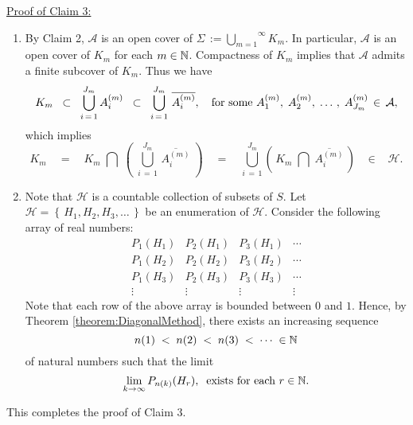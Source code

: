 \vskip 0.5cm
\noindent
\underline{Proof of Claim 3:}
\begin{enumerate}
\item
By Claim 2, $\mathcal{A}$ is an open cover of
$\Sigma \, := \overset{\infty}{\underset{m=1}{\bigcup}}K_{m}$.
In particular, $\mathcal{A}$ is an open cover of $K_{m}$ for each $m \in \mathbb{N}$.
Compactness of $K_{m}$ implies that $\mathcal{A}$ admits a finite subcover of $K_{m}$.
Thus we have
\begin{equation*}
K_{m}
\;\; \subset \;\; \bigcup^{J_{m}}_{i\,=\,1}A^{(m)}_{i}
\;\; \subset \;\; \bigcup^{J_{m}}_{i\,=\,1}\,\overline{A^{(m)}_{i}},
\quad
\textnormal{for some $A^{(m)}_{1},\;A^{(m)}_{2},\;\ldots\,,\;A^{(m)}_{J_{m}}\,\in\,\mathcal{A}$},
\end{equation*}
which implies
\begin{equation*}
K_{m}
\quad = \quad K_{m} \;\bigcap\; \left(\;\bigcup^{J_{m}}_{i\,=\,1}\,\overline{A^{(m)}_{i}} \;\right)
\quad = \quad \bigcup^{J_{m}}_{i\,=\,1} \left(\, K_{m} \;\bigcap\; \overline{A^{(m)}_{i}} \,\right)
\;\;\; \in \;\;\; \mathcal{H}.
\end{equation*}
\item
Note that $\mathcal{H}$ is a countable collection of subsets of $S$.
Let $\mathcal{H} = \left\{\,H_{1}, H_{2}, H_{3}, \ldots \,\right\}$ be an enumeration of $\mathcal{H}$.
Consider the following array of real numbers:
\begin{equation*}
\begin{array}{cccc}
P_{1}(H_{1}) & P_{2}(H_{1}) & P_{3}(H_{1}) & \cdots \\
P_{1}(H_{2}) & P_{2}(H_{2}) & P_{3}(H_{2}) & \cdots \\
P_{1}(H_{3}) & P_{2}(H_{3}) & P_{3}(H_{3}) & \cdots \\
\vdots & \vdots & \vdots & \vdots  
\end{array}
\end{equation*}
Note that each row of the above array is bounded between $0$ and $1$.
Hence, by Theorem \ref{theorem:DiagonalMethod}, there exists an increasing sequence
\begin{equation*}
n(1) \;<\;
n(2) \;<\;
n(3) \;<\;
\cdots\; \in \mathbb{N}
\end{equation*}
of natural numbers such that the limit
\begin{equation*}
\lim_{k\rightarrow\infty} P_{n(k)}(H_{r}),
\;\;\textnormal{exists for each $r \in \mathbb{N}$}.
\end{equation*}
\end{enumerate}
This completes the proof of Claim 3.

